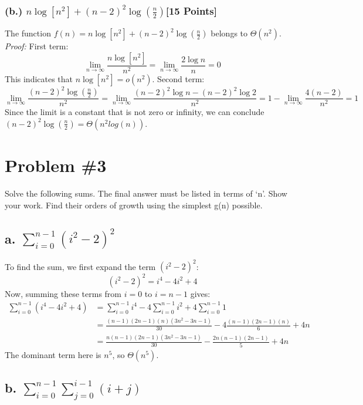\documentclass{article}
\begin{document}
\subsubsection*{(b.) \( n \log[n^2]+(n-2)^2 \log \left( \frac{n}{2} \right) \)[15 Points]}

The function \( f(n) = n \log[n^2]+(n-2)^2 \log \left( \frac{n}{2} \right) \) belongs to \( \Theta(n^2) \).
\newline 
\newline
\textit{Proof:}
\newline 
First term:
\[
\lim_{{n \to \infty}} \frac{n \log[n^2]}{n^2} = \lim_{{n \to \infty}} \frac{2 \log n}{n} = 0
\]
This indicates that \( n \log[n^2] = o(n^2) \).
Second term:
\[
\lim_{{n \to \infty}} \frac{(n-2)^2 \log \left( \frac{n}{2} \right)}{n^2} = \lim_{{n \to \infty}} \frac{(n-2)^2 \log n - (n-2)^2 \log 2}{n^2} = 1 - \lim_{{n \to \infty}} \frac{4(n-2)}{n^2} = 1
\]
Since the limit is a constant that is not zero or infinity, we can conclude \( (n-2)^2 \log \left( \frac{n}{2} \right) = \Theta(n^2log(n)) \).


\newpage
\section*{Problem \#3}
Solve the following sums. The final answer must be listed in terms of ‘n’. Show your work. 
\newline
Find their orders of growth using the simplest g(n) possible.


\subsection*{a. \( \sum_{{i=0}}^{{n-1}} (i^2 - 2)^2 \)}

To find the sum, we first expand the term \( (i^2 - 2)^2 \):
\[
(i^2 - 2)^2 = i^4 - 4i^2 + 4
\]
Now, summing these terms from \( i=0 \) to \( i=n-1 \) gives:
\[
\begin{aligned}
\sum_{{i=0}}^{{n-1}} (i^4 - 4i^2 + 4) &= \sum_{{i=0}}^{{n-1}} i^4 - 4\sum_{{i=0}}^{{n-1}} i^2 + 4\sum_{{i=0}}^{{n-1}} 1 \\
&= \frac{(n-1)(2n-1)(n)(3n^2 - 3n - 1)}{30} - 4\frac{(n-1)(2n-1)(n)}{6} + 4n \\
&= \frac{n(n-1)(2n-1)(3n^2 - 3n - 1)}{30} - \frac{2n(n-1)(2n-1)}{5} + 4n
\end{aligned}
\]
The dominant term here is \( n^5 \), so \( \Theta(n^5) \).

\subsection*{b. \( \sum_{{i=0}}^{{n-1}} \sum_{{j=0}}^{{i-1}} (i+j) \)}
\end{document}
